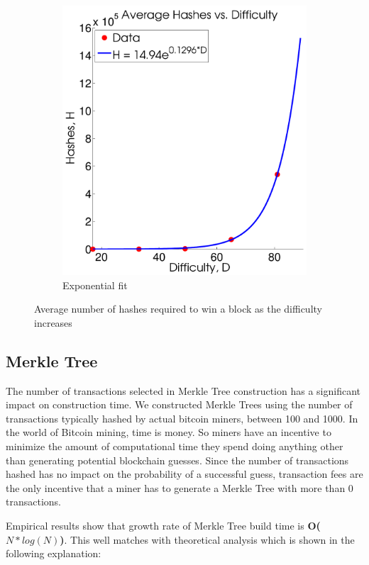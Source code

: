 \documentclass[pdftex,11pt]{article}
\begin{document}
\begin{figure}[H]
\begin{subfigure}[H]{0.4\textwidth}
		\includegraphics[width=\textwidth]{figures/Exp.pdf}
		\caption{Exponential fit}
	\end{subfigure}
	\caption{Average number of hashes required to win a block as the difficulty increases}
	\label{fig:hash}
\end{figure}

\subsection{Merkle Tree}
The number of transactions selected in Merkle Tree construction has a significant impact on construction time. We constructed Merkle Trees using the number of transactions typically hashed by actual bitcoin miners, between 100 and 1000. In the world of Bitcoin mining, time is money. So miners have an incentive to minimize the amount of computational time they spend doing anything other than generating potential blockchain guesses. Since the number of transactions hashed has no impact on the probability of a successful guess, transaction fees are the only incentive that a miner has to generate a Merkle Tree with more than 0 transactions.

Empirical results show that growth rate of Merkle Tree build time is {\bf O($N*log(N)$)}. This well matches with theoretical analysis which is shown in the following explanation:
\end{document}
